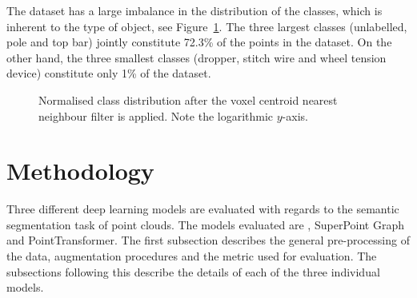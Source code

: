 The dataset has a large imbalance in the distribution of the classes, which is inherent to the type of object, see Figure~\ref{fig:semseg:class_distrib}. The three largest classes (unlabelled, pole and top bar) jointly constitute 72.3\% of the points in the dataset. On the other hand, the three smallest classes (dropper, stitch wire and wheel tension device) constitute only 1\% of the dataset.

\begin{figure}
    \centering
    \caption{Normalised class distribution after the voxel centroid nearest neighbour filter is applied. Note the logarithmic $y$-axis.}
    \label{fig:semseg:class_distrib}
\end{figure}

\section{Methodology} \label{sec:semseg:methodology}
Three different deep learning models are evaluated with regards to the semantic segmentation task of point clouds. The models evaluated are \pnpp{}, SuperPoint Graph and PointTransformer. The first subsection describes the general pre-processing of the data, augmentation procedures and the metric used for evaluation. The subsections following this describe the details of each of the three individual models.

